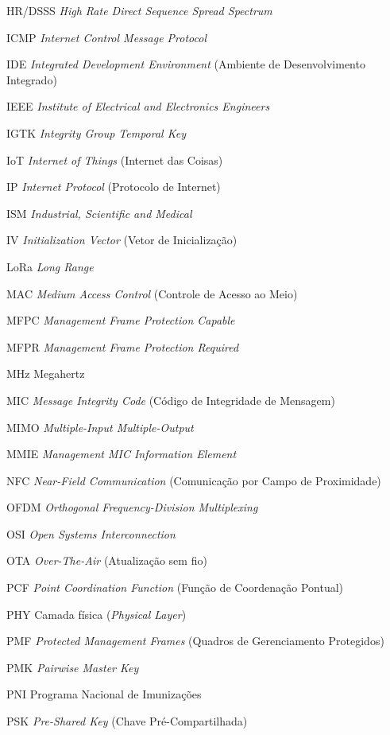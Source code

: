 \begin{siglas}
\item[HR/DSSS] \textit{High Rate Direct Sequence Spread Spectrum}
\item[ICMP] \textit{Internet Control Message Protocol}
\item[IDE] \textit{Integrated Development Environment} (Ambiente de Desenvolvimento Integrado)
\item[IEEE] \textit{Institute of Electrical and Electronics Engineers}
\item[IGTK] \textit{Integrity Group Temporal Key}
\item[IoT] \textit{Internet of Things} (Internet das Coisas)
\item[IP] \textit{Internet Protocol} (Protocolo de Internet)
\item[ISM] \textit{Industrial, Scientific and Medical}
\item[IV] \textit{Initialization Vector} (Vetor de Inicialização)
\item[LoRa] \textit{Long Range}
\item[MAC] \textit{Medium Access Control} (Controle de Acesso ao Meio)
\item[MFPC] \textit{Management Frame Protection Capable}
\item[MFPR] \textit{Management Frame Protection Required}
\item[MHz] Megahertz
\item[MIC] \textit{Message Integrity Code} (Código de Integridade de Mensagem)
\item[MIMO] \textit{Multiple-Input Multiple-Output}
\item[MMIE] \textit{Management MIC Information Element}
\item[NFC] \textit{Near-Field Communication} (Comunicação por Campo de Proximidade)
\item[OFDM] \textit{Orthogonal Frequency-Division Multiplexing}
\item[OSI] \textit{Open Systems Interconnection}
\item[OTA] \textit{Over-The-Air} (Atualização sem fio)
\item[PCF] \textit{Point Coordination Function} (Função de Coordenação Pontual)
\item[PHY] Camada física (\textit{Physical Layer})
\item[PMF] \textit{Protected Management Frames} (Quadros de Gerenciamento Protegidos)
\item[PMK] \textit{Pairwise Master Key}
\item[PNI] Programa Nacional de Imunizações
\item[PSK] \textit{Pre-Shared Key} (Chave Pré-Compartilhada)

\end{siglas}
